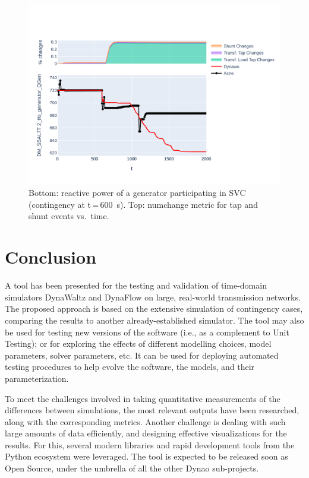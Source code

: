 \documentclass[conference]{IEEEtran}
\newcommand{\Dynawo}{Dyna\textomega o} %
\begin{document}
\begin{figure}
  \centering
  \includegraphics[width=\columnwidth]{figs/Qgen_curve_GENS_20210211-0930_moreT600}
  \caption{Bottom: reactive power of a generator participating in SVC
    (contingency at t\,=\,\SI{600}{s}). Top: numchange metric for tap and shunt events
    vs.\ time.}
  \label{fig:curveplot}
\end{figure}




\section{Conclusion}

A tool has been presented for the testing and validation of time-domain simulators
DynaWaltz and DynaFlow on large, real-world transmission networks.  The proposed approach
is based on the extensive simulation of contingency cases, comparing the results
to another already-established simulator. The tool may also be used for testing
new versions of the software (i.e., as a complement to Unit Testing); or for
exploring the effects of different modelling choices, model parameters, solver
parameters, etc.  It can be used for deploying automated testing procedures to
help evolve the software, the models, and their parameterization.

To meet the challenges involved in taking quantitative measurements of the
differences between simulations, the most relevant outputs have been researched,
along with the corresponding metrics. Another challenge is dealing with such
large amounts of data efficiently, and designing effective visualizations for
the results. For this, several modern libraries and rapid development tools from
the Python ecosystem were leveraged.  The tool is expected to be released soon
as Open Source, under the umbrella of all the other \Dynawo{} sub-projects.
\end{document}
